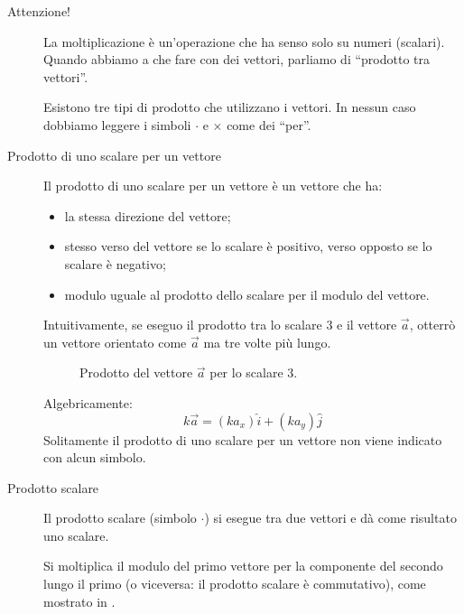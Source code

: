 \documentclass[a4paper,11pt,italian]{article}
\begin{document}
\begin{description}
  \item[Attenzione!]
  La moltiplicazione è un'operazione che ha senso solo su numeri (scalari). Quando abbiamo a che fare con dei vettori, parliamo di ``prodotto tra vettori''. 
  
  Esistono tre tipi di prodotto che utilizzano i vettori. In nessun caso dobbiamo leggere i simboli $ \cdot $ e $ \times $ come dei ``per''.
  
  \item[Prodotto di uno scalare per un vettore]
  Il prodotto di uno scalare per un vettore è un vettore che ha:
  \begin{itemize}
    \item la stessa direzione del vettore;
    \item stesso verso del vettore se lo scalare è positivo, verso opposto se lo scalare è negativo;
    \item modulo uguale al prodotto dello scalare per il modulo del vettore.
  \end{itemize}
  Intuitivamente, se eseguo il prodotto tra lo scalare $ 3 $ e il vettore $ \vec{a} $, otterrò un vettore orientato come $ \vec{a} $ ma tre volte più lungo.

\begin{figure}[htb]\centering
{}\caption{Prodotto del vettore $ \vec{a} $ per lo scalare $ 3 $.}
\label{img:prodottoscalarevettore}
\end{figure}

  Algebricamente: 
  \[ k \vec{a} = (k a_x)\hat{i} + (k a_y)\hat{j} \]
  Solitamente il prodotto di uno scalare per un vettore non viene indicato con alcun simbolo.
  
  \item[Prodotto scalare]
  Il prodotto scalare (simbolo $ \cdot $) si esegue tra due vettori e dà come risultato uno scalare.
  
  Si moltiplica il modulo del primo vettore per la componente del secondo lungo il primo (o viceversa: il prodotto scalare è commutativo), come mostrato in .


\end{description}
\end{document}
